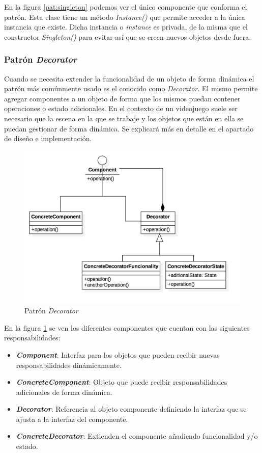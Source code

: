 \bigskip

En la figura \ref{pat:singleton} podemos ver el único componente que conforma el patrón. Esta clase tiene un método \textit{Instance()} que permite acceder a la única instancia que existe. Dicha instancia o \textit{instance} es privada, de la misma que el constructor \textit{Singleton()} para evitar así que se creen nuevos objetos desde fuera.


\subsubsection{Patrón \textit{Decorator}}

Cuando se necesita extender la funcionalidad de un objeto de forma dinámica el patrón más comúnmente usado es el conocido como \textit{Decorator}. El mismo permite agregar componentes a un objeto de forma que los mismos puedan contener operaciones o estado adicionales. En el contexto de un videojuego suele ser necesario que la escena en la que se trabaje y los objetos que están en ella se puedan gestionar de forma dinámica. Se explicará más en detalle en el apartado de diseño e implementación.

\bigskip

\begin{figure}
	\centerline{\includegraphics[width=12cm]{otros/UML/png/decorator.png}}
	\caption{Patrón \textit{Decorator}}
	\label{pat:decorator}
\end{figure}

\bigskip

En la figura \ref{pat:decorator} se ven los diferentes componentes que cuentan con las siguientes responsabilidades:

\begin{itemize}
	\item \textbf{\textit{Component}}: Interfaz para los objetos que pueden recibir nuevas responsabilidades dinámicamente.
	\item \textbf{\textit{ConcreteComponent}}: Objeto que puede recibir responsabilidades adicionales de forma dinámica.
	\item \textbf{\textit{Decorator}}: Referencia al objeto componente definiendo la interfaz que se ajusta a la interfaz del componente.
	\item \textbf{\textit{ConcreteDecorator}}: Extienden el componente añadiendo funcionalidad y/o estado.
\end{itemize}

